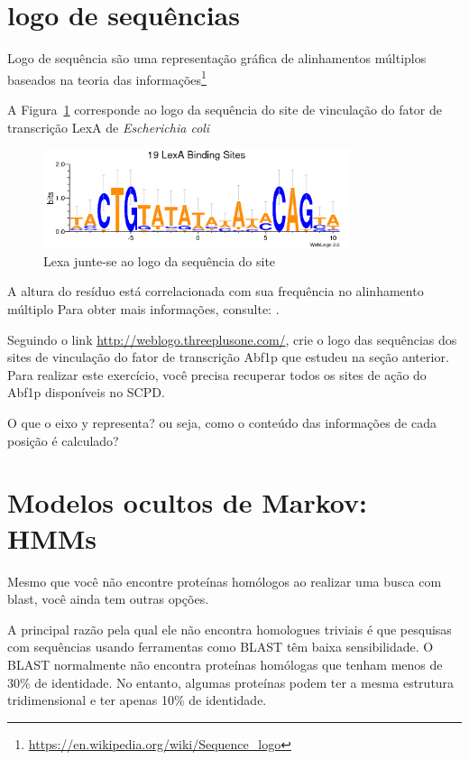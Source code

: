 \documentclass[letter,11pt]{book}
\begin{document}
\section{logo de sequências}

Logo de sequência são uma representação gráfica de alinhamentos múltiplos  baseados na teoria das informações\footnote{\url{https://en.wikipedia.org/wiki/Sequence_logo}}

A Figura~\ref{fig:lexALogo} corresponde ao logo da sequência do site de vinculação do fator de transcrição LexA de \textit{Escherichia coli}

\begin{figure}[h!]
\centering
 \includegraphics[width=9cm]{Figs/lexA.png}
 \caption{\label{fig:lexALogo}Lexa junte-se ao logo da sequência do site}
\end{figure}

A altura do resíduo está correlacionada com sua frequência no alinhamento  múltiplo {Para obter mais informações, consulte: \citealp{Schneider1990}}.

{\color{red}
Seguindo o link \url{http://weblogo.threeplusone.com/}, crie o logo das sequências dos sites de vinculação do fator de transcrição Abf1p que estudeu na seção anterior. Para realizar este exercício, você precisa recuperar todos os sites de ação do Abf1p disponíveis no SCPD.

O que o eixo y representa? ou seja, como o conteúdo das informações de cada posição é calculado?
}

\section{Modelos ocultos de Markov: HMMs}

Mesmo que você não encontre proteínas homólogos ao realizar uma busca com blast, você ainda tem outras opções.

A principal razão pela qual ele não encontra homologues triviais é que pesquisas com sequências usando ferramentas como BLAST têm baixa sensibilidade. O BLAST normalmente não encontra proteínas homólogas que tenham menos de 30\% de identidade. No entanto, algumas proteínas podem ter a mesma estrutura tridimensional e ter apenas 10\% de identidade.
\end{document}

